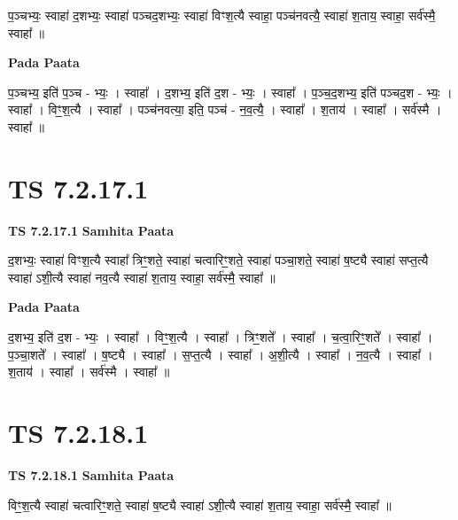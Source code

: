 \documentclass[17pt]{extarticle}
\begin{document}
प॒ञ्चभ्यः॒ स्वाहा॑ द॒शभ्यः॒ स्वाहा॑ पञ्चद॒शभ्यः॒ स्वाहा॑ विꣳश॒त्यै स्वाहा॒ पञ्च॑नवत्यै॒ स्वाहा॑ श॒ताय॒ स्वाहा॒ सर्व॑स्मै॒ स्वाहा᳚ ॥ \newline

\textbf{Pada Paata} \newline

प॒ञ्चभ्य॒ इति॑ प॒ञ्च - भ्यः॒ । स्वाहा᳚ । द॒शभ्य॒ इति॑ द॒श - भ्यः॒ । स्वाहा᳚ । प॒ञ्च॒द॒शभ्य॒ इति॑ पञ्चद॒श - भ्यः॒ । स्वाहा᳚ । विꣳ॒॒श॒त्यै । स्वाहा᳚ । पञ्च॑नवत्या॒ इति॒ पञ्च॑ - न॒व॒त्यै॒ । स्वाहा᳚ । श॒ताय॑ । स्वाहा᳚ । सर्व॑स्मै । स्वाहा᳚ ॥  \newline





\section{ TS 7.2.17.1 }

\textbf{TS 7.2.17.1 } \newline
\textbf{Samhita Paata} \newline

द॒शभ्यः॒ स्वाहा॑ विꣳश॒त्यै स्वाहा᳚ त्रिꣳ॒॒शते॒ स्वाहा॑ चत्वारिꣳ॒॒शते॒ स्वाहा॑ पञ्चा॒शते॒ स्वाहा॑ ष॒ष्ट्यै स्वाहा॑ सप्त॒त्यै स्वाहा॑ ऽशी॒त्यै स्वाहा॑ नव॒त्यै स्वाहा॑ श॒ताय॒ स्वाहा॒ सर्व॑स्मै॒ स्वाहा᳚ ॥ \newline

\textbf{Pada Paata} \newline

द॒शभ्य॒ इति॑ द॒श - भ्यः॒ । स्वाहा᳚ । विꣳ॒॒श॒त्यै । स्वाहा᳚ । त्रिꣳ॒॒शते᳚ । स्वाहा᳚ । च॒त्वा॒रिꣳ॒॒शते᳚ । स्वाहा᳚ । प॒ञ्चा॒शते᳚ । स्वाहा᳚ । ष॒ष्ट्यै । स्वाहा᳚ । स॒प्त॒त्यै । स्वाहा᳚ । अ॒शी॒त्यै । स्वाहा᳚ । न॒व॒त्यै । स्वाहा᳚ । श॒ताय॑ । स्वाहा᳚ । सर्व॑स्मै । स्वाहा᳚ ॥  \newline





\section{ TS 7.2.18.1 }

\textbf{TS 7.2.18.1 } \newline
\textbf{Samhita Paata} \newline

विꣳ॒॒श॒त्यै स्वाहा॑ चत्वारिꣳ॒॒शते॒ स्वाहा॑ ष॒ष्ट्यै स्वाहा॑ ऽशी॒त्यै स्वाहा॑ श॒ताय॒ स्वाहा॒ सर्व॑स्मै॒ स्वाहा᳚ ॥ \newline
\end{document}

